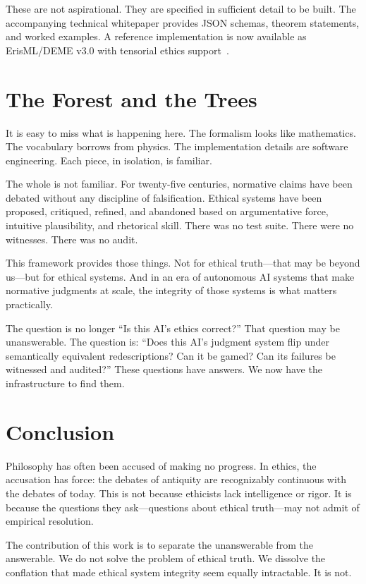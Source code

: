\documentclass[12pt]{article}
\begin{document}
These are not aspirational. They are specified in sufficient detail to be built. The
accompanying technical whitepaper provides JSON schemas, theorem statements,
and worked examples. A reference implementation is now available as ErisML/DEME v3.0 with tensorial ethics support~\cite{bond2026erisml}.

\section{The Forest and the Trees}

It is easy to miss what is happening here. The formalism looks like mathematics. The
vocabulary borrows from physics. The implementation details are software
engineering. Each piece, in isolation, is familiar.

The whole is not familiar. For twenty-five centuries, normative claims have been
debated without any discipline of falsification. Ethical systems have been proposed,
critiqued, refined, and abandoned based on argumentative force, intuitive
plausibility, and rhetorical skill. There was no test suite. There were no witnesses.
There was no audit.

This framework provides those things. Not for ethical truth---that may be beyond
us---but for ethical systems. And in an era of autonomous AI systems that make
normative judgments at scale, the integrity of those systems is what matters
practically.

The question is no longer ``Is this AI's ethics correct?'' That question may be
unanswerable. The question is: ``Does this AI's judgment system flip under
semantically equivalent redescriptions? Can it be gamed? Can its failures be
witnessed and audited?'' These questions have answers. We now have the
infrastructure to find them.

\section{Conclusion}

Philosophy has often been accused of making no progress. In ethics, the accusation
has force: the debates of antiquity are recognizably continuous with the debates of
today. This is not because ethicists lack intelligence or rigor. It is because the
questions they ask---questions about ethical truth---may not admit of empirical
resolution.

The contribution of this work is to separate the unanswerable from the answerable.
We do not solve the problem of ethical truth. We dissolve the conflation that made
ethical system integrity seem equally intractable. It is not.
\end{document}
